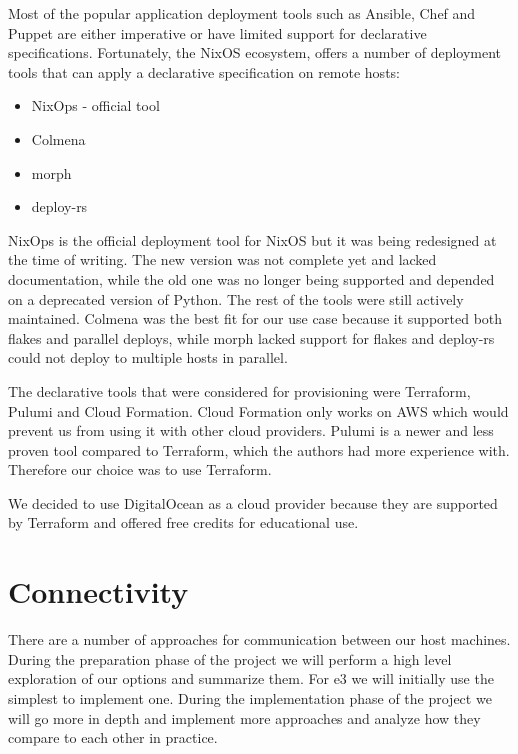 Most of the popular application deployment tools such as Ansible, Chef
and Puppet are either imperative or have limited support for declarative
specifications. Fortunately, the NixOS ecosystem, offers a number of
deployment tools that can apply a declarative specification on remote
hosts:

\begin{itemize}
\tightlist
\item
  NixOps\autocite{nixopsSource,nixopsDocs} - official tool
\item
  Colmena \autocite{colmenaSource,colmenaDocs}
\item
  morph \autocite{morphSource}
\item
  deploy-rs \autocite{deployrsSource}
\end{itemize}

NixOps is the official deployment tool for NixOS but it was being
redesigned at the time of writing. The new version was not complete yet
and lacked documentation, while the old one was no longer being
supported and depended on a deprecated version of Python. The rest of
the tools were still actively maintained. Colmena was the best fit for
our use case because it supported both flakes and parallel deploys,
while morph lacked support for flakes and deploy-rs could not deploy to
multiple hosts in parallel.

The declarative tools that were considered for provisioning were
Terraform, Pulumi and Cloud Formation. Cloud Formation only works on AWS
which would prevent us from using it with other cloud providers. Pulumi
is a newer and less proven tool compared to Terraform, which the authors
had more experience with. Therefore our choice was to use Terraform.

We decided to use DigitalOcean as a cloud provider because they are
supported by Terraform and offered free credits for educational use.

\hypertarget{connectivity}{%
\section{Connectivity}\label{connectivity}}

There are a number of approaches for communication between our host
machines. During the preparation phase of the project we will perform a
high level exploration of our options and summarize them. For \gls{e3}
we will initially use the simplest to implement one. During the
implementation phase of the project we will go more in depth and
implement more approaches and analyze how they compare to each other in
practice.

